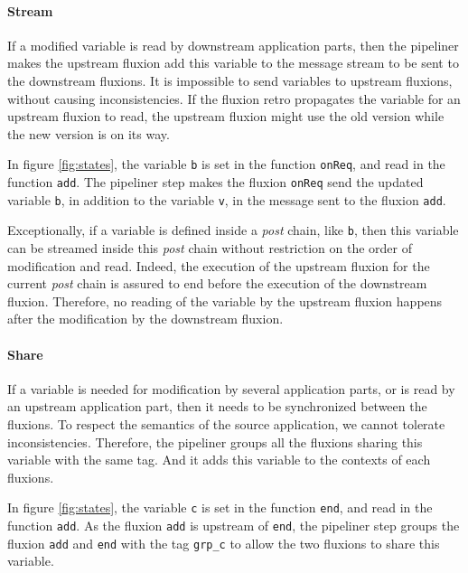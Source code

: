 \paragraph{Stream}
If a modified variable is read by downstream application parts, then the pipeliner makes the upstream fluxion add this variable to the message stream to be sent to the downstream fluxions.
It is impossible to send variables to upstream flux\-ions, without causing inconsistencies.
If the fluxion retro propagates the variable for an upstream fluxion to read, the upstream fluxion might use the old version while the new version is on its way.

In figure \ref{fig:states}, the variable \texttt{b} is set in the function \texttt{onReq}, and read in the function \texttt{add}.
The pipeliner step makes the fluxion \texttt{onReq} send the updated variable \texttt{b}, in addition to the variable \texttt{v}, in the message sent to the fluxion \texttt{add}.

Exceptionally, if a variable is defined inside a \textit{post} chain, like \texttt{b}, then this variable can be streamed inside this \textit{post} chain without restriction on the order of modification and read.
Indeed, the execution of the upstream fluxion for the current \textit{post} chain is assured to end before the execution of the downstream fluxion.
Therefore, no reading of the variable by the upstream fluxion happens after the modification by the downstream fluxion.

\paragraph{Share}
If a variable is needed for modification by several application parts, or is read by an upstream application part, then it needs to be synchronized between the fluxions.
To respect the semantics of the source application, we cannot tolerate inconsistencies.
Therefore, the pipeliner groups all the fluxions sharing this variable with the same tag.
And it adds this variable to the contexts of each fluxions.

In figure \ref{fig:states}, the variable \texttt{c} is set in the function \texttt{end}, and read in the function \texttt{add}.
As the fluxion \texttt{add} is upstream of \texttt{end}, the pipeliner step groups the fluxion \texttt{add} and \texttt{end} with the tag \texttt{grp\_c} to allow the two fluxions to share this variable.